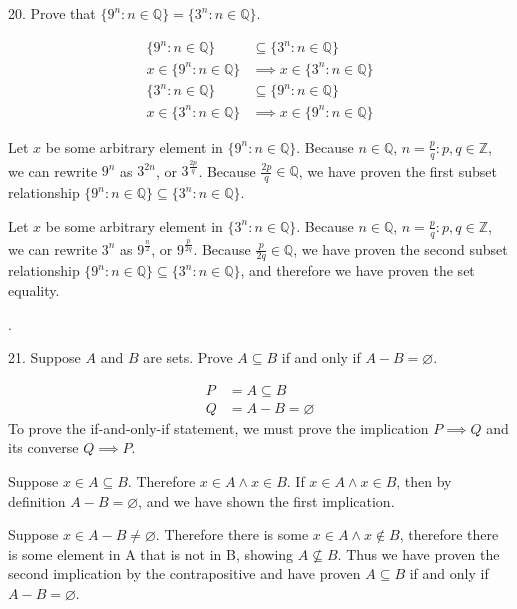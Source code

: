 \documentclass{idrisMemo}
\newcommand{\set}[1]{\{#1\}}
\begin{document}
\begin{prooflist}{20. Prove that $\set{9^n: n \in \mathbb{Q}}=\set{3^n: n \in
    \mathbb{Q}}$.}
\item
\begin{align*}
    \set{9^n: n \in \mathbb{Q}} &\subseteq\set{3^n: n \in \mathbb{Q}}\\
    x\in \set{9^n: n \in \mathbb{Q}} &\implies x\in\set{3^n: n \in \mathbb{Q}}\\
    \set{3^n: n \in \mathbb{Q}}
    &\subseteq
    \set{9^n: n \in \mathbb{Q}}\\
    x\in\set{3^n: n \in \mathbb{Q}}
    &\implies
    x\in \set{9^n: n \in \mathbb{Q}}
\end{align*}
\item Let $x$ be some arbitrary element in $\set{9^n: n \in \mathbb{Q}}$.
    Because $n\in\mathbb{Q}$, $n=\frac{p}{q}: p,q\in\mathbb{Z}$,
    we can rewrite $9^n$ as $3^{2n}$, or $3^{\frac{2p}{q}}$. Because
    $\frac{2p}{q} \in \mathbb{Q}$, we have proven the first subset
    relationship $\set{9^n: n \in \mathbb{Q}} \subseteq\set{3^n: n \in
    \mathbb{Q}}$.
\item Let $x$ be some arbitrary element in $\set{3^n: n \in \mathbb{Q}}$.
    Because $n\in\mathbb{Q}$, $n=\frac{p}{q}: p,q\in\mathbb{Z}$,
    we can rewrite $3^n$ as $9^{\frac{n}{2}}$, or $9^{\frac{p}{2q}}$. Because
    $\frac{p}{2q} \in \mathbb{Q}$, we have proven the second subset
    relationship $\set{9^n: n \in \mathbb{Q}} \subseteq\set{3^n: n \in
    \mathbb{Q}}$, and therefore we have proven the set equality.
\end{prooflist}.

\begin{prooflist}{21. Suppose $A$ and $B$ are sets. Prove $A \subseteq B$ if and only if $A-B=\varnothing$.}
\item
    \begin{align*}
        P &= A \subseteq B\\
        Q &= A - B = \varnothing
\end{align*}
To prove the if-and-only-if statement, we must prove the implication $P\implies
Q$ and its converse $Q\implies P$.
\item Suppose $x\in A\subseteq B$. Therefore $x\in A \land x \in B$. If $x\in
    A\land x\in B$, then by definition $A-B=\varnothing$, and we have shown the
    first implication.
\item Suppose $x\in A-B\neq\varnothing$. Therefore there is some $x\in A\land
    x\notin B$, therefore there is some element in A that is not in B, showing
    $A\not\subseteq B$. Thus we have proven the second implication by the
    contrapositive and have proven $A \subseteq B$ if and only if
    $A-B=\varnothing$.
\end{prooflist}
\end{document}
